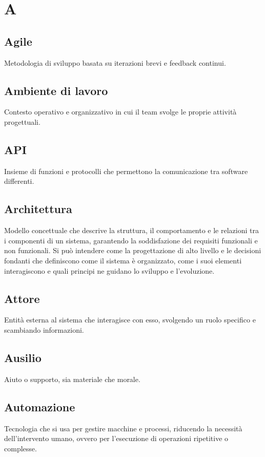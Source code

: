 \documentclass[a4paper,12pt]{article}
\begin{document}
    

\newpage

\newpage

        \section{A}
        
          \subsection*{Agile}
			Metodologia di sviluppo basata su iterazioni brevi e feedback continui.
          \subsection*{Ambiente di lavoro}
			Contesto operativo e organizzativo in cui il team svolge le proprie attività progettuali.
          \subsection*{API}
			Insieme di funzioni e protocolli che permettono la comunicazione tra software differenti.
          \subsection*{Architettura}
			Modello concettuale che descrive la struttura, il comportamento e le relazioni tra i componenti di un sistema, garantendo la soddisfazione dei requisiti funzionali e non funzionali. Si può intendere come la progettazione di alto livello e le decisioni fondanti che definiscono come il sistema è organizzato, come i suoi elementi interagiscono e quali principi ne guidano lo sviluppo e l'evoluzione.
          \subsection*{Attore}
			Entità esterna al sistema che interagisce con esso, svolgendo un ruolo specifico e scambiando informazioni.
          \subsection*{Ausilio}
			Aiuto o supporto, sia materiale che morale.
          \subsection*{Automazione}
			Tecnologia che si usa per gestire macchine e processi, riducendo la necessità dell'intervento umano, ovvero per l'esecuzione di operazioni ripetitive o complesse.
        
\end{document}
